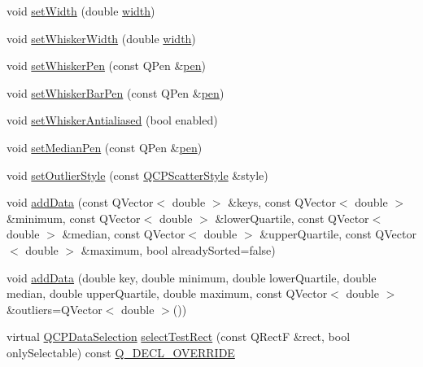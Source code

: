 \begin{DoxyCompactItemize}
\item 
void \hyperlink{class_q_c_p_statistical_box_a0b62775bd67301b1eba5c785f2b26f14}{set\+Width} (double \hyperlink{class_q_c_p_statistical_box_a0733a7bd575fc5929ce6d507bcc2a04c}{width})
\item 
void \hyperlink{class_q_c_p_statistical_box_adf378812446bd66f34d1f7f293d991cd}{set\+Whisker\+Width} (double \hyperlink{class_q_c_p_statistical_box_a0733a7bd575fc5929ce6d507bcc2a04c}{width})
\item 
void \hyperlink{class_q_c_p_statistical_box_a4a5034cb3b9b040444df05ab1684620b}{set\+Whisker\+Pen} (const Q\+Pen \&\hyperlink{class_q_c_p_abstract_plottable_a41d060007cc6b3037c9c04d22d0c0398}{pen})
\item 
void \hyperlink{class_q_c_p_statistical_box_aa8d3e503897788e1abf68dc74b5f147f}{set\+Whisker\+Bar\+Pen} (const Q\+Pen \&\hyperlink{class_q_c_p_abstract_plottable_a41d060007cc6b3037c9c04d22d0c0398}{pen})
\item 
void \hyperlink{class_q_c_p_statistical_box_a61bcd458fba002f72304d11319051843}{set\+Whisker\+Antialiased} (bool enabled)
\item 
void \hyperlink{class_q_c_p_statistical_box_a7260ac55b669f5d0a74f16d5ca84c52c}{set\+Median\+Pen} (const Q\+Pen \&\hyperlink{class_q_c_p_abstract_plottable_a41d060007cc6b3037c9c04d22d0c0398}{pen})
\item 
void \hyperlink{class_q_c_p_statistical_box_ad5241943422eb8e58360a97e99ad6aa7}{set\+Outlier\+Style} (const \hyperlink{class_q_c_p_scatter_style}{Q\+C\+P\+Scatter\+Style} \&style)
\item 
void \hyperlink{class_q_c_p_statistical_box_a9a8739c5b8291db8fd839e892fc8f478}{add\+Data} (const Q\+Vector$<$ double $>$ \&keys, const Q\+Vector$<$ double $>$ \&minimum, const Q\+Vector$<$ double $>$ \&lower\+Quartile, const Q\+Vector$<$ double $>$ \&median, const Q\+Vector$<$ double $>$ \&upper\+Quartile, const Q\+Vector$<$ double $>$ \&maximum, bool already\+Sorted=false)
\item 
void \hyperlink{class_q_c_p_statistical_box_a026f2790b530d6f29312254ecb1e7c1e}{add\+Data} (double key, double minimum, double lower\+Quartile, double median, double upper\+Quartile, double maximum, const Q\+Vector$<$ double $>$ \&outliers=Q\+Vector$<$ double $>$())
\item 
virtual \hyperlink{class_q_c_p_data_selection}{Q\+C\+P\+Data\+Selection} \hyperlink{class_q_c_p_statistical_box_a42febad6ad5e924a151434cc434b4ffc}{select\+Test\+Rect} (const Q\+RectF \&rect, bool only\+Selectable) const \hyperlink{qcustomplot_8hh_a42cc5eaeb25b85f8b52d2a4b94c56f55}{Q\+\_\+\+D\+E\+C\+L\+\_\+\+O\+V\+E\+R\+R\+I\+DE}

\end{DoxyCompactItemize}
